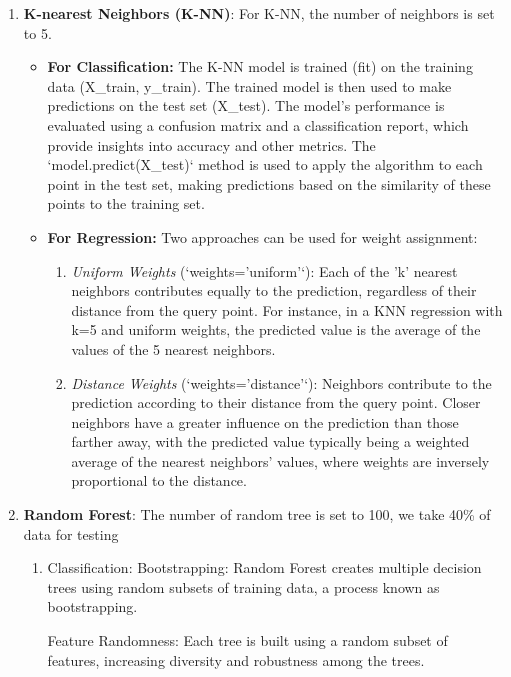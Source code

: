 \documentclass[a4paper]{article}
\begin{document}
\begin{enumerate}
	\item \textbf{K-nearest Neighbors (K-NN)}: 
	For K-NN, the number of neighbors is set to 5.
	\begin{itemize}
		\item \textbf{For Classification:}
		The K-NN model is trained (fit) on the training data (X\_train, y\_train). The trained model is then used to make predictions on the test set (X\_test). The model's performance is evaluated using a confusion matrix and a classification report, which provide insights into accuracy and other metrics. The `model.predict(X\_test)` method is used to apply the algorithm to each point in the test set, making predictions based on the similarity of these points to the training set.
		
		\item \textbf{For Regression:}
		Two approaches can be used for weight assignment:
		\begin{enumerate}
			\item \textit{Uniform Weights} (`weights='uniform'`): Each of the 'k' nearest neighbors contributes equally to the prediction, regardless of their distance from the query point. For instance, in a KNN regression with k=5 and uniform weights, the predicted value is the average of the values of the 5 nearest neighbors.
			
			\item \textit{Distance Weights} (`weights='distance'`): Neighbors contribute to the prediction according to their distance from the query point. Closer neighbors have a greater influence on the prediction than those farther away, with the predicted value typically being a weighted average of the nearest neighbors' values, where weights are inversely proportional to the distance.
		\end{enumerate}
	\end{itemize}
	
	\item \textbf{Random Forest}: 
	The number of random tree is set to 100, we take 40\% of data for testing
	\begin{enumerate}
\item Classification:
		Bootstrapping: Random Forest creates multiple decision trees using random subsets of training data, a process known as bootstrapping.
		
		Feature Randomness: Each tree is built using a random subset of features, increasing diversity and robustness among the trees.
		

\end{enumerate}
\end{enumerate}
\end{document}
